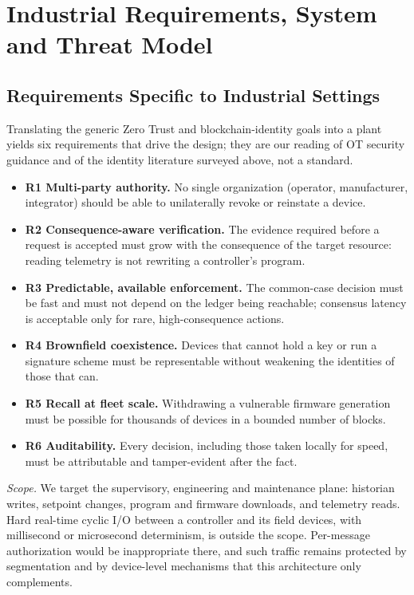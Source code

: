 \section{Industrial Requirements, System and Threat Model}\label{sec:model}

\subsection{Requirements Specific to Industrial Settings}\label{sec:reqs}
Translating the generic Zero Trust and blockchain-identity goals into a plant yields six requirements that drive the design; they are our reading of OT security guidance \cite{stouffer2023sp80082} and of the identity literature surveyed above, not a standard.
\begin{itemize}[leftmargin=1.1em,itemsep=0pt,topsep=1pt]
  \item \textbf{R1 Multi-party authority.} No single organization (operator, manufacturer, integrator) should be able to unilaterally revoke or reinstate a device.
  \item \textbf{R2 Consequence-aware verification.} The evidence required before a request is accepted must grow with the consequence of the target resource: reading telemetry is not rewriting a controller's program.
  \item \textbf{R3 Predictable, available enforcement.} The common-case decision must be fast and must not depend on the ledger being reachable; consensus latency is acceptable only for rare, high-consequence actions.
  \item \textbf{R4 Brownfield coexistence.} Devices that cannot hold a key or run a signature scheme must be representable without weakening the identities of those that can.
  \item \textbf{R5 Recall at fleet scale.} Withdrawing a vulnerable firmware generation must be possible for thousands of devices in a bounded number of blocks.
  \item \textbf{R6 Auditability.} Every decision, including those taken locally for speed, must be attributable and tamper-evident after the fact.
\end{itemize}
\emph{Scope.} We target the supervisory, engineering and maintenance plane: historian writes, setpoint changes, program and firmware downloads, and telemetry reads. Hard real-time cyclic I/O between a controller and its field devices, with millisecond or microsecond determinism, is outside the scope. Per-message authorization would be inappropriate there, and such traffic remains protected by segmentation and by device-level mechanisms that this architecture only complements.

